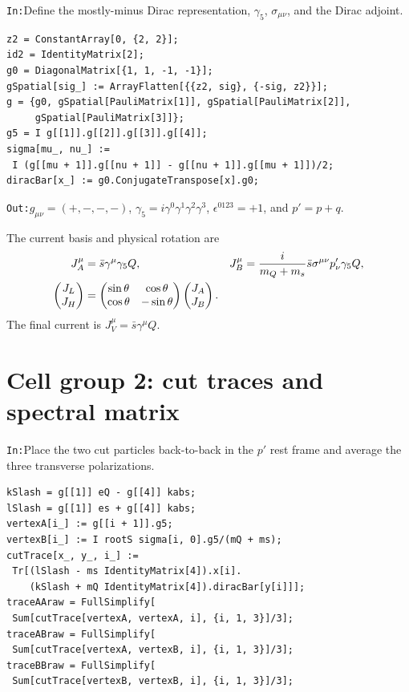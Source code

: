 \documentclass[10pt,a4paper]{article}
\newcommand{\InputCell}[1]{%
  \par\medskip\noindent\colorbox{cellblue}{%
  \parbox{\dimexpr\linewidth-2\fboxsep}{\texttt{In:}\quad #1}}\par\smallskip}
\newcommand{\OutputCell}[1]{%
  \par\smallskip\noindent\colorbox{outputgray}{%
  \parbox{\dimexpr\linewidth-2\fboxsep}{\texttt{Out:}\quad #1}}\par\medskip}
\begin{document}
\InputCell{Define the mostly-minus Dirac representation, $\gamma_5$,
$\sigma_{\mu\nu}$, and the Dirac adjoint.}
\begin{lstlisting}
z2 = ConstantArray[0, {2, 2}];
id2 = IdentityMatrix[2];
g0 = DiagonalMatrix[{1, 1, -1, -1}];
gSpatial[sig_] := ArrayFlatten[{{z2, sig}, {-sig, z2}}];
g = {g0, gSpatial[PauliMatrix[1]], gSpatial[PauliMatrix[2]],
     gSpatial[PauliMatrix[3]]};
g5 = I g[[1]].g[[2]].g[[3]].g[[4]];
sigma[mu_, nu_] :=
 I (g[[mu + 1]].g[[nu + 1]] - g[[nu + 1]].g[[mu + 1]])/2;
diracBar[x_] := g0.ConjugateTranspose[x].g0;
\end{lstlisting}
\OutputCell{$g_{\mu\nu}=(+,-,-,-)$,
$\gamma_5=i\gamma^0\gamma^1\gamma^2\gamma^3$,
$\epsilon^{0123}=+1$, and $p'=p+q$.}

The current basis and physical rotation are
\begin{align}
J_A^\mu&=\bar s\gamma^\mu\gamma_5Q,&
J_B^\mu&={i\over m_Q+m_s}\bar s\sigma^{\mu\nu}p'_\nu\gamma_5Q,\\
\begin{pmatrix}J_L\\J_H\end{pmatrix}
&=\begin{pmatrix}\sin\theta&\cos\theta\\
\cos\theta&-\sin\theta\end{pmatrix}
\begin{pmatrix}J_A\\J_B\end{pmatrix}.
\end{align}
The final current is $J_V^\mu=\bar s\gamma^\mu Q$.

\section{Cell group 2: cut traces and spectral matrix}

\InputCell{Place the two cut particles back-to-back in the $p'$ rest frame
and average the three transverse polarizations.}
\begin{lstlisting}
kSlash = g[[1]] eQ - g[[4]] kabs;
lSlash = g[[1]] es + g[[4]] kabs;
vertexA[i_] := g[[i + 1]].g5;
vertexB[i_] := I rootS sigma[i, 0].g5/(mQ + ms);
cutTrace[x_, y_, i_] :=
 Tr[(lSlash - ms IdentityMatrix[4]).x[i].
    (kSlash + mQ IdentityMatrix[4]).diracBar[y[i]]];
traceAAraw = FullSimplify[
 Sum[cutTrace[vertexA, vertexA, i], {i, 1, 3}]/3];
traceABraw = FullSimplify[
 Sum[cutTrace[vertexA, vertexB, i], {i, 1, 3}]/3];
traceBBraw = FullSimplify[
 Sum[cutTrace[vertexB, vertexB, i], {i, 1, 3}]/3];
\end{lstlisting}
\end{document}
